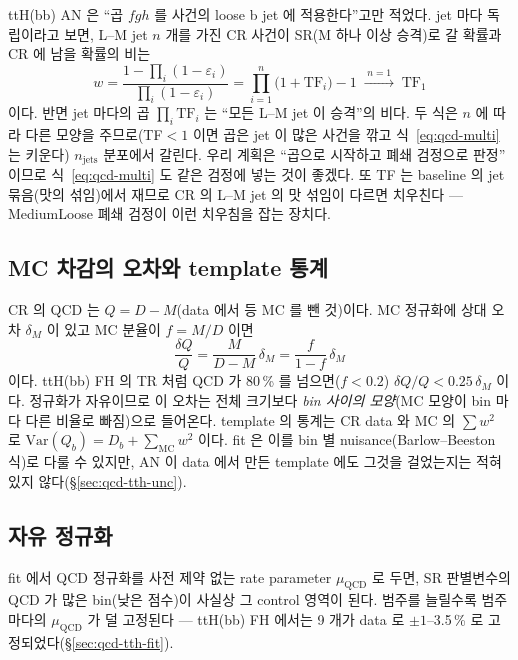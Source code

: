 \begin{note}
ttH(bb) AN 은 ``곱 $f g h$ 를 사건의 loose b jet 에 적용한다''고만 적었다. jet 마다 독립이라고 보면, L–M jet
$n$ 개를 가진 CR 사건이 SR(M 하나 이상 승격)로 갈 확률과 CR 에 남을 확률의 비는
\begin{equation}
w=\frac{1-\prod_i(1-\varepsilon_i)}{\prod_i(1-\varepsilon_i)}=\prod_{i=1}^{n}\bigl(1+\text{TF}_i\bigr)-1
\;\xrightarrow{\;n=1\;}\;\text{TF}_1
\label{eq:qcd-multi}
\end{equation}
이다. 반면 jet 마다의 곱 $\prod_i\text{TF}_i$ 는 ``모든 L–M jet 이 승격''의 비다. 두 식은 $n$ 에 따라 다른 모양을 주므로(TF$<1$ 이면 곱은 jet 이 많은 사건을
깎고 식~\eqref{eq:qcd-multi} 는 키운다) $n_{\text{jets}}$ 분포에서 갈린다. 우리 계획은 ``곱으로 시작하고 폐쇄 검정으로 판정''
이므로 식~\eqref{eq:qcd-multi} 도 같은 검정에 넣는 것이 좋겠다. 또 TF 는 baseline 의 jet 묶음(맛의 섞임)에서 재므로 CR 의 L–M jet 의 맛 섞임이 다르면
치우친다 — MediumLoose 폐쇄 검정이 이런 치우침을 잡는 장치다.
\end{note}

\subsection{MC 차감의 오차와 template 통계}
CR 의 QCD 는 $Q=D-M$(data 에서 \ttbar{} 등 MC 를 뺀 것)이다. MC 정규화에 상대 오차 $\delta_M$ 이 있고 MC 분율이 $f=M/D$ 이면
\begin{equation}
\frac{\delta Q}{Q}=\frac{M}{D-M}\,\delta_M=\frac{f}{1-f}\,\delta_M
\label{eq:qcd-subtr}
\end{equation}
이다. ttH(bb) FH 의 TR 처럼 QCD 가 80\,\% 를 넘으면($f<0.2$) $\delta Q/Q<0.25\,\delta_M$ 이다. 정규화가 자유이므로 이 오차는 전체 크기보다 \emph{bin 사이의
모양}(MC 모양이 bin 마다 다른 비율로 빠짐)으로 들어온다. template 의 통계는 CR data 와 MC 의 $\sum w^2$ 로 $\text{Var}(Q_b)=D_b+\sum_{\text{MC}}w^2$ 이다.
fit 은 이를 bin 별 nuisance(Barlow–Beeston 식)로 다룰 수 있지만, AN 이 data 에서 만든 template 에도 그것을 걸었는지는 적혀 있지 않다(\S\ref{sec:qcd-tth-unc}).

\subsection{자유 정규화}
fit 에서 QCD 정규화를 사전 제약 없는 rate parameter $\mu_{\text{QCD}}$ 로 두면, SR 판별변수의 QCD 가 많은 bin(낮은 점수)이 사실상 그 control 영역이
된다. 범주를 늘릴수록 범주마다의 $\mu_{\text{QCD}}$ 가 덜 고정된다 — ttH(bb) FH 에서는 9 개가 data 로 $\pm1$–3.5\,\% 로 고정되었다(\S\ref{sec:qcd-tth-fit}).

